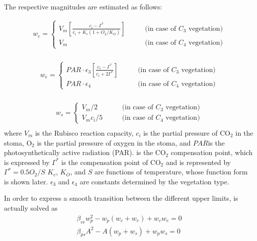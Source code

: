 The respective magnitudes are estimated as follows:

\begin{eqnarray}
 w_c = \left\{
\begin{array}{ll}
\displaystyle{
V_m \left[ \frac{c_i - \Gamma^\ast}{c_i + K_c(1+O_2/K_O)}\right]
}
   & \qquad\text{(in case of $C_3$ vegetation)}\\
 V_m
   & \qquad\text{(in case of $C_4$ vegetation)}
\end{array}
\right. \\
\end{eqnarray}

\begin{eqnarray}
 w_e = \left\{
\begin{array}{ll}
\displaystyle{
PAR\cdot \epsilon_3 \left[ \frac{c_i-\Gamma^\ast }{c_i+2\Gamma^\ast}\right]
}
  & \qquad\text{(in case of $C_3$ vegetation)}\\
PAR\cdot \epsilon_4
  & \qquad\text{(in case of $C_4$ vegetation)}
\end{array}
\right. \\
\end{eqnarray}

\begin{eqnarray}
 w_s = \left\{
\begin{array}{ll}
V_m / 2
  & \qquad\text{(in case of $C_3$ vegetation)}\\
V_m c_i/ 5
  & \qquad\text{(in case of $C_4$ vegetation)}
\end{array}
\right. \\
\end{eqnarray} where \(V_m\) is the Rubisco reaction capacity, \(c_i\) is the partial pressure of \(\mathrm{CO_2}\) in the stoma, \(\mathrm{O_2}\) is the partial pressure of oxygen in the stoma, and \(PAR\)is the
photosynthetically active radiation (PAR). is the \(\mathrm{CO_2}\) compensation point, which is expressed by \(\Gamma^*\) is the compensation point of \(\mathrm{CO_2}\) and is represented by
\(\Gamma^* = 0.5 O_2 / S\) \(K_c\), \(K_O\), and \(S\) are functions of temperature, whose function form is shown later. \(\epsilon_3\) and \(\epsilon_4\) are constants determined by the vegetation
type.

In order to express a smooth transition between the different upper limits, \hyperref[eq76]{} is actually solved as \begin{eqnarray}
 \beta_{ce} w_p^2 - w_p(w_c + w_e) + w_c w_e = 0 \\
 \beta_{ps} A^2 - A(w_p + w_s) + w_p w_s = 0
\end{eqnarray}

